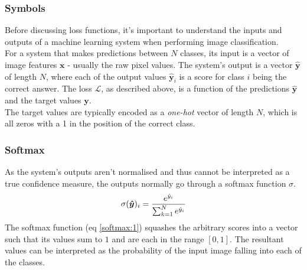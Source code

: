 \documentclass{report}
\begin{document}
	\subsubsection{Symbols}
	Before discussing loss functions, it's important to understand the inputs and outputs of a machine learning system when performing image classification. \\
	For a system that makes predictions between $N$ classes, its input is a vector of image features $\bm{x}$ - usually the raw pixel values. The system's output is a vector $\bm{\hat{y}}$ of length $N$, where each of the output values $\bm{\hat{y}}_i$ is a score for class $i$ being the correct answer. The loss $\mathcal{L}$, as described above, is a function of the predictions $\bm{\hat{y}}$ and the target values $\bm{y}$. \\
	The target values are typically encoded as a \textit{one-hot} vector of length $N$, which is all zeros with a 1 in the position of the correct class. \\
	
	\subsubsection{Softmax}
	As the system's outputs aren't normalised and thus cannot be interpreted as a true confidence measure, the outputs normally go through a softmax function $\sigma$.
	\begin{equation} \label{softmax:1}
	\sigma(\bm{\hat{y}})_i = \frac{e^{\hat{y}_i}}{\sum_{k=1}^{N}e^{\hat{y}_i}} \\
	\end{equation}                                                              
	The softmax function (eq \ref{softmax:1}) squashes the arbitrary scores into a vector such that its values sum to $1$ and are each in the range $[0, 1]$. The resultant values can be interpreted as the probability of the input image falling into each of the classes. \\
	
\end{document}

